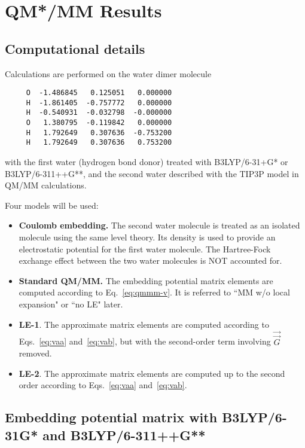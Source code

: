 \documentclass[aip,jcp,preprint,superscriptaddress,amsmath,amssymb]{revtex4-1}
\begin{document}

\section{QM*/MM Results}

\subsection{Computational details}
Calculations are performed on the water dimer molecule 
\begin{verbatim}
     O  -1.486845   0.125051   0.000000
     H  -1.861405  -0.757772   0.000000
     H  -0.540931  -0.032798  -0.000000
     O   1.380795  -0.119842   0.000000
     H   1.792649   0.307636  -0.753200
     H   1.792649   0.307636   0.753200
\end{verbatim}
with the first water (hydrogen bond donor) treated with B3LYP/6-31+G* or B3LYP/6-311++G**, 
and the second water described with the TIP3P model in QM/MM calculations.   

Four models will be used:
\begin{itemize}
\item \textbf{Coulomb embedding.}   The second water molecule is treated as an isolated molecule using the same level theory.   
Its density is used to provide an electrostatic potential for the first water molecule.   
The Hartree-Fock exchange effect between the two water molecules is NOT accounted for.  
\item \textbf{Standard QM/MM.}   The embedding potential matrix elements are computed according to Eq.~\ref{eq:qmmm-v}.  It is referred to ``MM w/o  local expansion" or ``no LE" later.   
\item \textbf{LE-1}.    The approximate matrix elements are computed according to Eqs.~\ref{eq:vaa} and~\ref{eq:vab}, but with the second-order term involving $\vec{\vec{G}}$ removed. 
\item \textbf{LE-2}.    The approximate matrix elements are computed up to the second order according to Eqs.~\ref{eq:vaa} and~\ref{eq:vab}.  
\end{itemize}

\subsection{Embedding potential matrix with B3LYP/6-31G* and B3LYP/6-311++G**}
\end{document}
